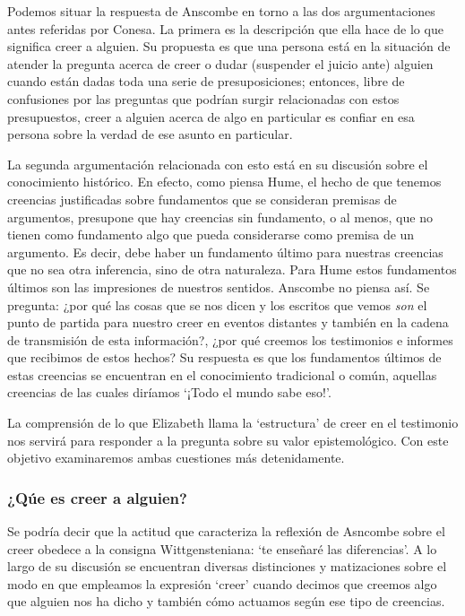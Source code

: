 Podemos situar la respuesta de Anscombe en torno a las dos argumentaciones antes referidas por Conesa. La primera es la descripción que ella hace de lo que significa creer a alguien. Su propuesta es que una persona está en la situación de atender la pregunta acerca de creer o dudar (suspender el juicio ante) alguien cuando están dadas toda una serie de presuposiciones; entonces, libre de confusiones por las preguntas que podrían surgir relacionadas con estos presupuestos, creer a alguien acerca de algo en particular es confiar en esa persona sobre la verdad de ese asunto en particular.

La segunda argumentación relacionada con esto está en su discusión sobre el conocimiento histórico. En efecto, como piensa Hume, el hecho de que tenemos creencias justificadas sobre fundamentos que se consideran premisas de argumentos, presupone que hay creencias sin fundamento, o al menos, que no tienen como fundamento algo que pueda considerarse como premisa de un argumento. Es decir, debe haber un fundamento último para nuestras creencias que no sea otra inferencia, sino de otra naturaleza. Para Hume estos fundamentos últimos son las impresiones de nuestros sentidos. Anscombe no piensa así. Se pregunta: ¿por qué las cosas que se nos dicen y los escritos que vemos \emph{son} el punto de partida para nuestro creer en eventos distantes y también en la cadena de transmisión de esta información?, ¿por qué creemos los testimonios e informes que recibimos de estos hechos? Su respuesta es que los fundamentos últimos de estas creencias se encuentran en el conocimiento tradicional o común, aquellas creencias de las cuales diríamos \enquote*{¡Todo el mundo sabe eso!}.

La comprensión de lo que Elizabeth llama la `estructura' de creer en el testimonio nos servirá para responder a la pregunta sobre su valor epistemológico. Con este objetivo examinaremos ambas cuestiones más detenidamente.

\subsubsection{¿Qúe es creer a alguien?}

Se podría decir que la actitud que caracteriza la reflexión de Asncombe sobre el creer obedece a la consigna Wittgensteniana: \enquote*{te enseñaré las diferencias}. A lo largo de su discusión se encuentran diversas distinciones y matizaciones sobre el modo en que empleamos la expresión `creer' cuando decimos que creemos algo que alguien nos ha dicho y también cómo actuamos según ese tipo de creencias.

